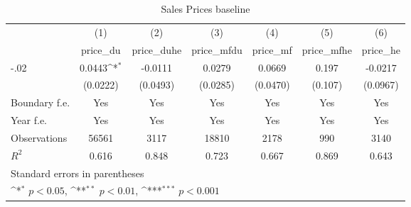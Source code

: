 \begin{table}[htbp]\centering
\def\sym#1{\ifmmode^{#1}\else\(^{#1}\)\fi}
\caption{Sales Prices baseline}
\begin{tabular}{l*{6}{c}}
\hline\hline
                    &\multicolumn{1}{c}{(1)}&\multicolumn{1}{c}{(2)}&\multicolumn{1}{c}{(3)}&\multicolumn{1}{c}{(4)}&\multicolumn{1}{c}{(5)}&\multicolumn{1}{c}{(6)}\\
                    &\multicolumn{1}{c}{price\_du}&\multicolumn{1}{c}{price\_duhe}&\multicolumn{1}{c}{price\_mfdu}&\multicolumn{1}{c}{price\_mf}&\multicolumn{1}{c}{price\_mfhe}&\multicolumn{1}{c}{price\_he}\\
\hline
-.02                &      0.0443\sym{*}  &     -0.0111         &      0.0279         &      0.0669         &       0.197         &     -0.0217         \\
                    &    (0.0222)         &    (0.0493)         &    (0.0285)         &    (0.0470)         &     (0.107)         &    (0.0967)         \\
[1em]
Boundary f.e.       &         Yes         &         Yes         &         Yes         &         Yes         &         Yes         &         Yes         \\
[1em]
Year f.e.           &         Yes         &         Yes         &         Yes         &         Yes         &         Yes         &         Yes         \\
\hline
Observations        &       56561         &        3117         &       18810         &        2178         &         990         &        3140         \\
\(R^{2}\)           &       0.616         &       0.848         &       0.723         &       0.667         &       0.869         &       0.643         \\
\hline\hline
\multicolumn{7}{l}{\footnotesize Standard errors in parentheses}\\
\multicolumn{7}{l}{\footnotesize \sym{*} \(p<0.05\), \sym{**} \(p<0.01\), \sym{***} \(p<0.001\)}\\
\end{tabular}
\end{table}
